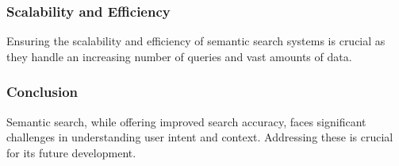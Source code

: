 \documentclass{beamer}
\begin{document}
\begin{frame}
\frametitle{Scalability and Efficiency}
Ensuring the scalability and efficiency of semantic search systems is crucial as they handle an increasing number of queries and vast amounts of data.
\end{frame}

\begin{frame}
\frametitle{Conclusion}
Semantic search, while offering improved search accuracy, faces significant challenges in understanding user intent and context. Addressing these is crucial for its future development.
\end{frame}
\end{document}
